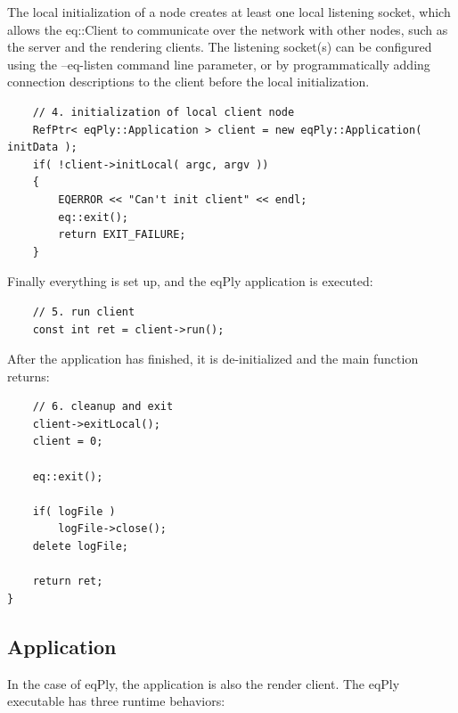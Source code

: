 \documentclass[10pt,a4]{scrartcl}
\begin{document}
The local initialization of a node creates at least one local listening
socket, which allows the \textsf{eq::Client} to communicate over the
network with other nodes, such as the server and the rendering
clients. The listening socket(s) can be configured using the
\textsf{--eq-listen} command line parameter, or by programmatically
adding connection descriptions to the client before the local
initialization.

{\footnotesize\begin{lstlisting}
    // 4. initialization of local client node
    RefPtr< eqPly::Application > client = new eqPly::Application( initData );
    if( !client->initLocal( argc, argv ))
    {
        EQERROR << "Can't init client" << endl;
        eq::exit();
        return EXIT_FAILURE;
    }
\end{lstlisting}}%

Finally everything is set up, and the \textsf{eqPly} application is executed:

{\footnotesize\begin{lstlisting}
    // 5. run client
    const int ret = client->run();
\end{lstlisting}}

After the application has finished, it is de-initialized and the
\textsf{main} function returns:

{\footnotesize\begin{lstlisting}
    // 6. cleanup and exit
    client->exitLocal();
    client = 0;

    eq::exit();

    if( logFile )
        logFile->close();
    delete logFile;

    return ret;
}
\end{lstlisting}}


\subsection{Application}

In the case of \textsf{eqPly}, the application is also the render
client. The \textsf{eqPly} executable has three runtime behaviors:
\end{document}
